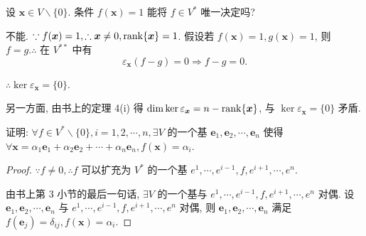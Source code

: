\documentclass{ctexart}
\begin{document}
\begin{exercise}%
    设 $\boldsymbol{x}\in V\backslash\{0\}$. 条件 $f(\boldsymbol{x})=1$ 能将 $f\in V^*$ 唯一决定吗?
\end{exercise}
\begin{solution}
    不能. $\because f(\boldsymbol{x})=1,\therefore\boldsymbol{x}\neq0,\operatorname{rank} \{\boldsymbol{x}\}=1$. 假设若 $f(\boldsymbol{x})=1,g(\boldsymbol{x})=1$, 则 $f=g.\therefore$ 在 $V^{**}$ 中有
    \[\varepsilon_{\boldsymbol{x}}(f-g)=0\Rightarrow f-g=0.\]

    $\therefore\ker\varepsilon_{\boldsymbol{x}}=\{0\}$.
    
    另一方面, 由书上的定理 4(i) 得 $\dim\ker\varepsilon_{\boldsymbol{x}}=n-\operatorname{rank} \{\boldsymbol{x}\}$, 与 $\ker\varepsilon_{\boldsymbol{x}}=\{0\}$ 矛盾.
\end{solution}
\begin{exercise}%
    证明: $\forall f\in V^*\backslash\{0\},i=1,2,\cdots,n,\exists V$ 的一个基 $\boldsymbol{e}_1,\boldsymbol{e}_2,\cdots,\boldsymbol{e}_n$ 使得 $\forall\boldsymbol{x}=\alpha_1\boldsymbol{e}_1+\alpha_2\boldsymbol{e}_2+\cdots+\alpha_n\boldsymbol{e}_n,f(\boldsymbol{x})=\alpha_i$.
\end{exercise}
\begin{proof}
    $\because f\neq 0,\therefore f$ 可以扩充为 $V^*$ 的一个基 $e^1,\cdots,e^{i-1},f,e^{i+1},\cdots,e^n$.
    
    由书上第 3 小节的最后一句话, $\exists V$ 的一个基与 $e^1,\cdots,e^{i-1},f,e^{i+1},\cdots,e^n$ 对偶. 设 $\boldsymbol{e}_1,\boldsymbol{e}_2,\cdots,\boldsymbol{e}_n$ 与 $e^1,\cdots,e^{i-1},f,e^{i+1},\cdots,e^n$ 对偶, 则 $\boldsymbol{e}_1,\boldsymbol{e}_2,\cdots,\boldsymbol{e}_n$ 满足 $f(\boldsymbol{e}_j)=\delta_{ij},f(\boldsymbol{x})=\alpha_i$.
\end{proof}
\end{document}
